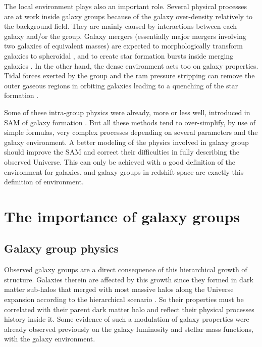 The local environment plays also an important role. Several physical processes
are at work inside galaxy groups because of the galaxy over-density relatively
to the background field. They are mainly caused by interactions between each
galaxy and/or the group. Galaxy mergers (essentially major mergers involving
two galaxies of equivalent masses) are expected to morphologically transform
galaxies to spheroidal \citep{Naab+99,Bournaud+05}, and to create star
formation bursts inside merging galaxies \citep{Cox+08,Teyssier+10}. In the
other hand, the dense environment acts too on galaxy properties. Tidal forces
exerted by the group and the ram pressure stripping can remove the outer
gaseous regions in orbiting galaxies leading to a quenching of the star
formation \citep{Larson+80,Bekki+13}.

Some of these intra-group physics were already, more or less well, introduced
in SAM of galaxy formation \citep{Okamoto+03,Lanzoni+05,Font+08,Guo+11}. But
all these methods tend to over-simplify, by use of simple formulas, very
complex processes depending on several parameters and the galaxy environment. A
better modeling of the physics involved in galaxy group should improve the SAM
and correct their difficulties in fully describing the observed Universe. This
can only be achieved with a good definition of the environment for galaxies,
and galaxy groups in redshift space are exactly this definition of environment.

\section{The importance of galaxy groups}
\label{sec:the_importance_of_galaxy_groups}

\subsection{Galaxy group physics}
\label{sub:galaxy_group_physics}

Observed galaxy groups are a direct consequence of this hierarchical growth of
structure. Galaxies therein are affected by this growth since they formed in
dark matter sub-halos that merged with most massive halos along the Universe
expansion according to the hierarchical scenario \citep{Lacey+93}. So their
properties must be correlated with their parent dark matter halo and reflect
their physical processes history inside it. Some evidence of such a modulation
of galaxy properties were already observed previously on the galaxy luminosity
\citep{Robotham+10} and stellar mass \citep{Yang+09} functions, with the galaxy
environment.

